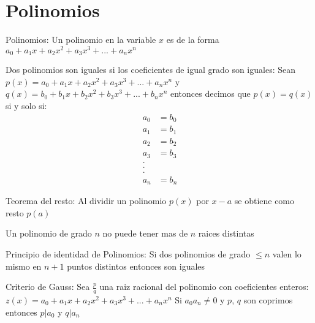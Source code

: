 %
%
%
% 
% 
%
\section{Polinomios}
\begin{defi}{Polinomios:}
   Un polinomio en la variable $x$ es de la forma $a_0 + a_1 x + a_2 x^2 + a_3 x^3 + ... + a_n x^n$
\end{defi}
\begin{defi}
   Dos polinomios son iguales si los coeficientes de igual grado son iguales: Sean $p(x) = a_0 + a_1 x + a_2 x^2 + a_3 x^3 + ... + a_n x^n$ y 
   $q(x) = b_0 + b_1 x + b_2 x^2 + b_3 x^3 + ... + b_n x^n$ entonces decimos que $p(x) = q(x)$ si y solo si:
   \begin{align}
      a_0 &= b_0\\
      a_1 &= b_1\\
      a_2 &= b_2\\
      a_3 &= b_3\\
      .\\
      .\\
      .\\
      a_n &= b_n
   \end{align}
\end{defi}

\begin{teo}{Teorema del resto:}
   Al dividir un polinomio $p(x)$ por $x-a$ se obtiene como resto $p(a)$
\end{teo}
\begin{teo}
   Un polinomio de grado $n$ no puede tener mas de $n$ raices distintas
\end{teo}

\begin{teo}{Principio de identidad de Polinomios:}
   Si dos polinomios de grado $\leq n$ valen lo mismo en $n+1$ puntos distintos entonces son iguales
\end{teo}
 \begin{teo}{Criterio de Gauss:}
    Sea $\frac{p}{q}$ una raiz racional del polinomio con coeficientes enteros: $z(x) = a_0 + a_1 x + a_2 x^2 + a_3 x^3 + ... + a_n x^n$
    Si $a_0 a_n \neq 0$ y $p$, $q$ son coprimos entonces $p|a_0$ y $q|a_n$
 \end{teo}
